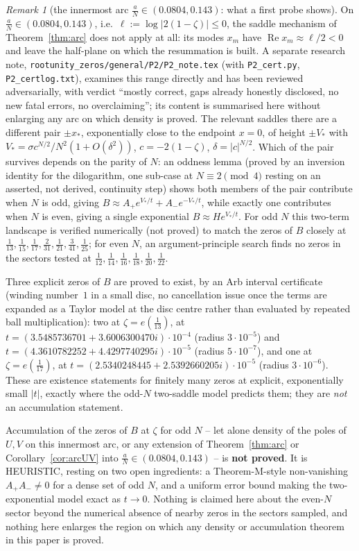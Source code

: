 \documentclass[11pt]{article}
\theoremstyle{plain}
\theoremstyle{definition}
\theoremstyle{remark}
\newtheorem{remark}[theorem]{Remark}
\theoremstyle{plain}\newtheorem*{maintheorem}{Main Theorem}
\begin{document}
\begin{remark}[the innermost arc $\frac aN\in(0.0804,0.143)$: what a first probe shows]\label{rem:innerarc}
On $\frac aN\in(0.0804,0.143)$, i.e.\ $\ell:=\log|2(1-\zeta)|\le0$, the saddle mechanism of Theorem~\ref{thm:arc} does not apply at all:
its modes $x_m$ have $\operatorname{Re}x_m\approx\ell/2<0$ and leave the half-plane on which the resummation is built. A separate
research note, \texttt{rootunity\_zeros/general/P2/P2\_note.tex} (with \texttt{P2\_cert.py}, \texttt{P2\_certlog.txt}), examines this
range directly and has been reviewed adversarially, with verdict ``mostly correct, gaps already honestly disclosed, no new fatal
errors, no overclaiming''; its content is summarised here without enlarging any arc on which density is proved. The relevant
saddles there are a different pair $\pm x_*$, exponentially close to the endpoint $x=0$, of height $\pm V_*$ with
$V_*=\sigma c^{N/2}/N^2(1+O(\delta^2))$, $c=-2(1-\zeta)$, $\delta=|c|^{N/2}$. Which of the pair survives depends on the parity of $N$:
an oddness lemma (proved by an inversion identity for the dilogarithm, one sub-case at $N\equiv2\!\pmod4$ resting on an asserted,
not derived, continuity step) shows both members of the pair contribute when $N$ is odd, giving $B\approx A_+e^{V_*/t}+A_-e^{-V_*/t}$,
while exactly one contributes when $N$ is even, giving a single exponential $B\approx He^{V_*/t}$. For odd $N$ this two-term
landscape is verified numerically (not proved) to match the zeros of $B$ closely at $\frac1{13},\frac1{15},\frac1{17},\frac2{31}
,\frac1{21},\frac3{41},\frac1{25}$; for even $N$, an argument-principle search finds no zeros in the sectors tested at
$\frac1{12},\frac1{14},\frac1{16},\frac1{18},\frac1{20},\frac1{22}$.

Three explicit zeros of $B$ are proved to exist, by an Arb interval certificate (winding number~$1$ in a small disc, no
cancellation issue once the terms are expanded as a Taylor model at the disc centre rather than evaluated by repeated ball
multiplication): two at $\zeta=e(\frac1{13})$, at $t=(3.5485736701+3.6006300470i)\cdot10^{-4}$ (radius $3\cdot10^{-5}$) and
$t=(4.3610782252+4.4297740295i)\cdot10^{-5}$ (radius $5\cdot10^{-7}$), and one at $\zeta=e(\frac1{17})$, at
$t=(2.5340248445+2.5392660205i)\cdot10^{-5}$ (radius $3\cdot10^{-6}$). These are existence statements for finitely many zeros at
explicit, exponentially small $|t|$, exactly where the odd-$N$ two-saddle model predicts them; they are \emph{not} an
accumulation statement.

Accumulation of the zeros of $B$ at $\zeta$ for odd $N$ -- let alone density of the poles of $U,V$ on this innermost arc, or any
extension of Theorem~\ref{thm:arc} or Corollary~\ref{cor:arcUV} into $\frac aN\in(0.0804,0.143)$ -- is \textbf{not proved}. It is
HEURISTIC, resting on two open ingredients: a Theorem-M-style non-vanishing $A_+A_-\ne0$ for a dense set of odd $N$, and a
uniform error bound making the two-exponential model exact as $t\to0$. Nothing is claimed here about the even-$N$ sector beyond
the numerical absence of nearby zeros in the sectors sampled, and nothing here enlarges the region on which any density or
accumulation theorem in this paper is proved.
\end{remark}
\end{document}
